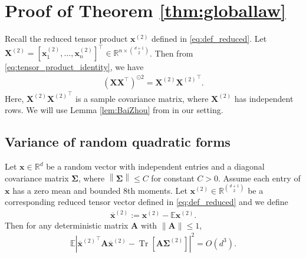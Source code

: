 \documentclass[twoside,11pt]{article}
\newcommand{\norm}[1]{\left\|#1\right\|}
\newcommand{\E}{\mathbb{E}}
\def\bA{{\boldsymbol A}}
\def\bX{{\boldsymbol X}}
\def\bx{{\boldsymbol x}}
\def\bSigma{{\boldsymbol \Sigma}}
\newcommand{\Tr}{\operatorname{Tr}}
\newcommand{\1}{\mathbf{1}}
\begin{document}

\section{Proof of Theorem \ref{thm:globallaw}}\label{sec:limiting_law}

Recall the reduced tensor product $\bx^{(2)}$ defined in \eqref{eq:def_reduced}.  Let $\bX^{(2)}=[ \bx_1^{(2)},\dots, \bx_n^{(2)}]^\top \in \mathbb R^{n\times \binom{d+1}{2}}$. Then from \eqref{eq:tensor_product_identity}, we have  \begin{align}\label{eq:sample_covariance_equivalence}
(\bX\bX^\top)^{\odot 2}=\bX^{(2)}{\bX^{(2)}}^\top.
\end{align}
Here, $\bX^{(2)}{\bX^{(2)}}^\top$ is a sample covariance matrix, where $\bX^{(2)}$ has independent rows. We will use Lemma \ref{lem:BaiZhou} from \cite{bai2008large} in our setting.

\subsection{Variance of random quadratic forms}

\begin{lemma} Let $\bx\in \mathbb R^d$ be a random vector with independent entries and a diagonal covariance matrix $\bSigma$, where $\norm{\bSigma}\leq C$ for constant $C>0$. Assume each entry of $\bx$ has a zero mean and bounded 8th moments.   Let $\bx^{(2)}\in \mathbb R^{\binom{d+1}{2}}$ be a corresponding reduced tensor  vector  defined in \eqref{eq:def_reduced} and we define
      \begin{align}\label{eq:centered_x2}
      \overline\bx^{(2)}:=\bx^{(2)}-\E \bx^{(2)}.
      \end{align}
Then for any deterministic matrix $\bA$ with $\|\bA\|\leq 1$,
\begin{align}\label{eq:BZ_tensor}
    \E\left| {\overline\bx^{(2)}}^\top \bA\overline\bx^{(2)} -\Tr[\bA \bSigma^{(2)}]\right|^2=O(d^3).
     \end{align}
\end{lemma}
\end{document}
